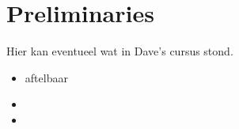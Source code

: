 \appendix
\chapter{Preliminaries}


Hier kan eventueel wat in Dave's cursus stond.


\begin{itemize}
\item 
aftelbaar

\item 

\item 

\end{itemize}
